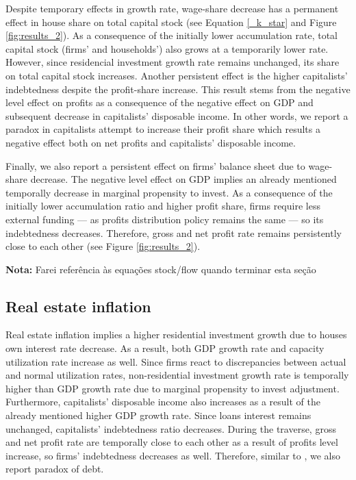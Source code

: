 \documentclass[11pt]{article}
\begin{document}
Despite temporary effects in growth rate, wage-share decrease has a permanent effect in house share on total capital stock (see Equation \ref{_k_star} and Figure \ref{fig:results_2}).
As a consequence of the initially lower accumulation rate, total capital stock (firms' and households') also grows at a temporarily lower rate.
However, since residencial investment growth rate remains unchanged, its share on total capital stock increases.
Another persistent effect is the higher capitalists' indebtedness despite the profit-share increase.
This result stems from the negative level effect on profits as a consequence of the negative effect on GDP and subsequent decrease in capitalists' disposable income.
In other words, we report a paradox in capitalists attempt to increase their profit share which results a negative effect both on net profits and capitalists' disposable income.

Finally, we also report a persistent effect on firms' balance sheet due to wage-share decrease.
The negative level effect on GDP implies an already mentioned temporally decrease in marginal propensity to invest.
As a consequence of the initially lower accumulation ratio and higher profit share, firms require less external funding --- as profits distribution policy remains the same  --- so its indebtedness decreases.
Therefore, gross and net profit rate remains persistently close to each other (see Figure \ref{fig:results_2}).

\textbf{Nota:} Farei referência às equações stock/flow quando terminar esta seção

\subsection{Real estate inflation}
\label{sec:org66c6146}
\label{sec:Exp2}


Real estate inflation implies a higher residential investment growth due to houses own interest rate decrease.
As a result, both GDP growth rate and capacity utilization rate increase as well.
Since firms react to discrepancies between actual and normal utilization rates, non-residential investment growth rate 
is temporally higher than GDP growth rate due to marginal propensity to invest adjustment.
Furthermore, capitalists' disposable income also increases as a result of the already mentioned higher GDP growth rate.
Since loans interest remains unchanged, capitalists' indebtedness ratio decreases.
During the traverse, gross and net profit rate are temporally close to each other as a result of profits level increase, so firms' indebtedness decreases as well.
Therefore, similar to \textcite{mandarino-2020-worker-debt}, we also report paradox of debt.
\end{document}
